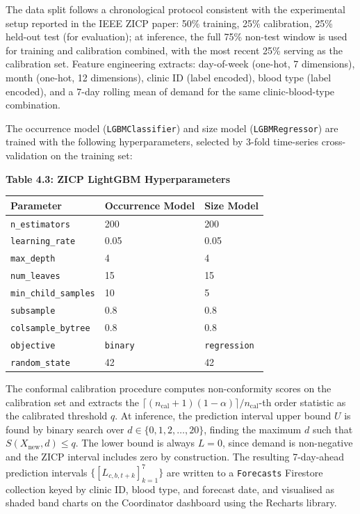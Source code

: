 \documentclass[12pt,a4paper]{article}
\begin{document}
\noindent The data split follows a chronological protocol consistent with the experimental setup reported in the IEEE ZICP paper: 50\% training, 25\% calibration, 25\% held-out test (for evaluation); at inference, the full 75\% non-test window is used for training and calibration combined, with the most recent 25\% serving as the calibration set. Feature engineering extracts: day-of-week (one-hot, 7 dimensions), month (one-hot, 12 dimensions), clinic ID (label encoded), blood type (label encoded), and a 7-day rolling mean of demand for the same clinic-blood-type combination.

\noindent The occurrence model (\texttt{LGBMClassifier}) and size model (\texttt{LGBMRegressor}) are trained with the following hyperparameters, selected by 3-fold time-series cross-validation on the training set:

\begin{center}
\textbf{Table 4.3: ZICP LightGBM Hyperparameters}
\vspace{0.4em}
\begin{tabular}{lll}
\toprule
\textbf{Parameter} & \textbf{Occurrence Model} & \textbf{Size Model} \\
\midrule
\texttt{n\_estimators} & 200 & 200 \\
\texttt{learning\_rate} & 0.05 & 0.05 \\
\texttt{max\_depth} & 4 & 4 \\
\texttt{num\_leaves} & 15 & 15 \\
\texttt{min\_child\_samples} & 10 & 5 \\
\texttt{subsample} & 0.8 & 0.8 \\
\texttt{colsample\_bytree} & 0.8 & 0.8 \\
\texttt{objective} & \texttt{binary} & \texttt{regression} \\
\texttt{random\_state} & 42 & 42 \\
\bottomrule
\end{tabular}
\end{center}

\noindent The conformal calibration procedure computes non-conformity scores on the calibration set and extracts the $\lceil(n_\text{cal}+1)(1-\alpha)\rceil/n_\text{cal}$-th order statistic as the calibrated threshold $q$. At inference, the prediction interval upper bound $U$ is found by binary search over $d \in \{0, 1, 2, \ldots, 20\}$, finding the maximum $d$ such that $S(X_\text{new}, d) \leq q$. The lower bound is always $L = 0$, since demand is non-negative and the ZICP interval includes zero by construction. The resulting 7-day-ahead prediction intervals $\{[L_{c,b,t+k}]_{k=1}^{7}\}$ are written to a \texttt{Forecasts} Firestore collection keyed by clinic ID, blood type, and forecast date, and visualised as shaded band charts on the Coordinator dashboard using the Recharts library.
\end{document}
